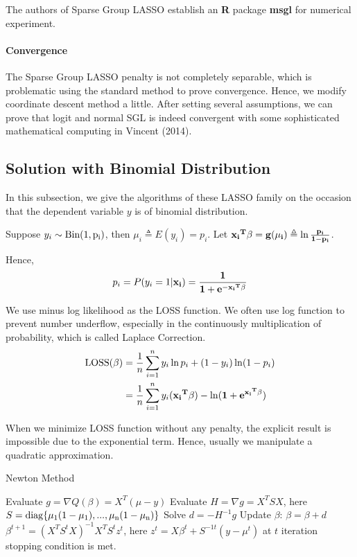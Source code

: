 \documentclass[]{article}
\begin{document}
The authors of Sparse Group LASSO establish an \textbf{R} package \textbf{msgl} for numerical experiment.

\paragraph{Convergence}
The Sparse Group LASSO penalty is not completely separable, which is problematic using the standard method to prove convergence. Hence, we modify coordinate descent method a little. After setting several assumptions, we can prove that logit and normal SGL is indeed convergent with some sophisticated mathematical computing in Vincent (2014)\cite{vincent2014sparse}. 

\subsection{Solution with Binomial Distribution}
In this subsection, we give the algorithms of these LASSO family on the occasion that the dependent variable $y$ is of binomial distribution. 

Suppose $ y_i \sim \rm Bin(1,p_i) $, then $ \mu_i\triangleq E(y_i)=p_i $.
Let $ \bf{x_i}^T\beta =g(\mu_i)\triangleq \ln\frac{p_i}{1-p_i} $.

Hence,
\begin{equation}
p_i=P(y_i=1|\bf{x_i})=\frac{1}{1+e^{-\bf{x_i}^T\beta}} 
\end{equation}

We use minus log likelihood as the LOSS function. We often use log function to prevent number underflow, especially in the continuously multiplication of probability, which is called Laplace Correction.
\begin{align*}
\rm LOSS(\beta)&=\frac{1}{n}\sum_{i=1}^n y_i\ln p_i+(1-y_i)\ln(1-p_i) \\
&=\frac{1}{n}\sum_{i=1}^n y_i(\bf{x_i}^T\beta)-\ln(1+e^{\bf{x_i}^T\beta})
\end{align*}

When we minimize LOSS function without any penalty, the explicit result is impossible due to the exponential term. Hence, usually we manipulate a quadratic approximation.

\begin{algorithm}  
	\caption{Newton Method}  
	\begin{algorithmic}[1] %
		\Repeat
		\State Evaluate $ g=\nabla Q(\beta)=X^T(\mu-y)$
		\State Evaluate $ H=\nabla g=X^TSX$, here $S=\rm diag\{\mu_1(1-\mu_1),...,\mu_n(1-\mu_n)\}$
		\State Solve $ d=-H^{-1}g $
		\State Update $\beta$: $\beta=\beta+d$
		\State $\beta^{t+1}=(X^TS^tX)^{-1}X^TS^tz^t$, here $z^t=X\beta^t+S^{-1t}(y-\mu^t)$ at $ t $ iteration
		\Until stopping condition is met.
	\end{algorithmic}
\end{algorithm} 
\end{document}

